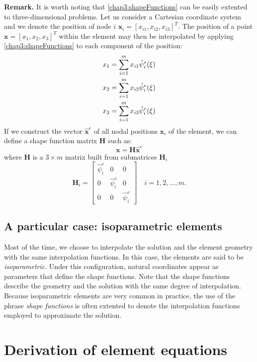 \noindent \textbf{Remark.}
It is worth noting that \eqref{chap3:shapeFunctions} can be easily extented to three-dimensional problems. Let us consider a Cartesian coordinate system and we denote the position of node $ i $ $ \mathbf{x}_i = [x_{i1}, x_{i2}, x_{i3}]^T$. The position of a point $ \mathbf{x} = [x_{1}, x_{2}, x_{3}]^T$ within the element may then be interpolated by applying \eqref{chap3:shapeFunctions} to each component of the position:
\begin{align}
x_1 &= \sum_{i=1}^m x_{i1} \hat{\psi}_i^e(\xi) \notag \\
x_2 &= \sum_{i=1}^m x_{i2} \hat{\psi}_i^e(\xi) \\
x_3 &= \sum_{i=1}^m x_{i3} \hat{\psi}_i^e(\xi) \notag
\end{align}
If we construct the vector $ \hat{\mathbf{x}}^e $ of all nodal positions $ \mathbf{x}_i $ of the element, we can define a shape function matrix $ \mathbf{H} $ such as:
\begin{equation}
\label{chap3:H}
\mathbf{x} = \mathbf{H} \hat{\mathbf{x}}^e
\end{equation}
where $ \mathbf{H} $ is a $ 3 \times m $ matrix built from submatrices $ \mathbf{H}_i $
\begin{equation}
\mathbf{H}_i = 
	\begin{bmatrix}
		\hat{\psi}_i^e & 0 & 0 \\
		0 & \hat{\psi}_i^e & 0 \\
		0 & 0 & \hat{\psi}_i^e
	\end{bmatrix}
\quad i = 1, 2, \ldots, m.
\end{equation}


	\subsection{A particular case: isoparametric elements}
Most of the time, we choose to interpolate the solution and the element geometry with the same interpolation functions. In this case, the elements are said to be \emph{isoparametric}. Under this configuration, natural coordinates appear as parameters that define the shape functions. Note that the shape functions describe the geometry and the solution with the same degree of interpolation. Because isoparametric elements are very common in practice, the use of the phrase \emph{shape functions} is often extented to denote the interpolation functions employed to approximate the solution.
	
	
\section{Derivation of element equations}	

